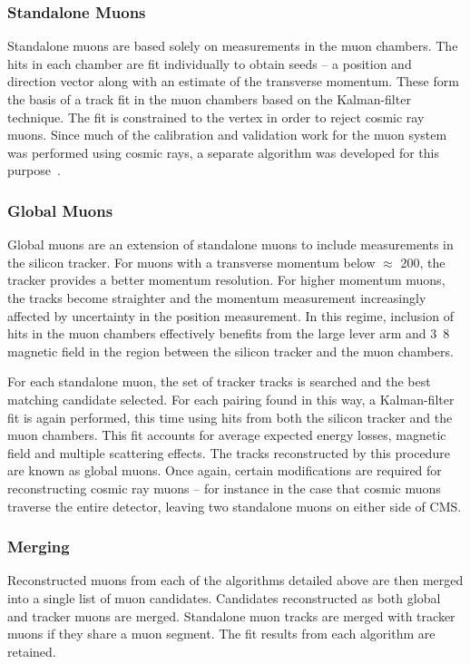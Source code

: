 \subsubsection{Standalone Muons}
Standalone muons are based solely on measurements in the muon chambers. The hits
in each chamber are fit individually to obtain seeds -- a position and direction
vector along with an estimate of the transverse momentum. These form the basis
of a track fit in the muon chambers based on the Kalman-filter technique. The
fit is constrained to the vertex in order to reject cosmic ray muons. Since much
of the calibration and validation work for the muon system was performed using
cosmic rays, a separate algorithm was developed for this purpose~\cite{cms_mu_reco_cosmic}.

\subsubsection{Global Muons}
Global muons are an extension of standalone muons to include measurements in the
silicon tracker. For muons with a transverse momentum below $\approx$
\unit{200}{\GeV}, the tracker provides a better momentum resolution. For higher
momentum muons, the tracks become straighter and the momentum measurement
increasingly affected by uncertainty in the position measurement. In this
regime, inclusion of hits in the muon chambers effectively benefits from the
large lever arm and \unit{3.8}{\tesla} magnetic field in the region between the
silicon tracker and the muon chambers.

For each standalone muon, the set of tracker tracks is searched and the best
matching candidate selected. For each pairing found in this way, a Kalman-filter
fit is again performed, this time using hits from both the silicon tracker and
the muon chambers. This fit accounts for average expected energy losses,
magnetic field and multiple scattering effects. The tracks reconstructed by this
procedure are known as global muons. Once again, certain modifications are
required for reconstructing cosmic ray muons -- for instance in the case that
cosmic muons traverse the entire detector, leaving two standalone muons on
either side of \ac{CMS}.

\subsubsection{Merging}
Reconstructed muons from each of the algorithms detailed above are then merged
into a single list of muon candidates. Candidates reconstructed as both global
and tracker muons are merged. Standalone muon tracks are merged with tracker
muons if they share a muon segment. The fit results from each algorithm are
retained.

